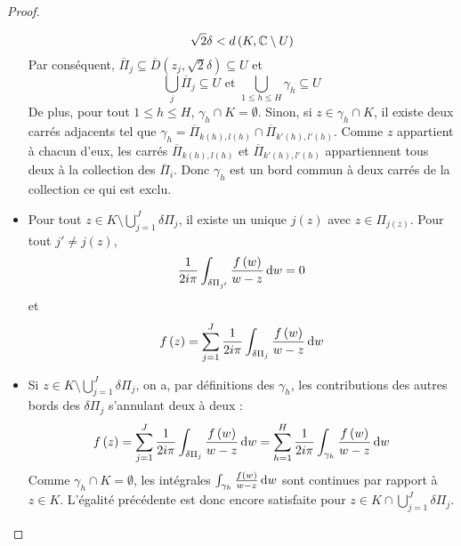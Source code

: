 \documentclass{cours}
\begin{document}
\begin{proof}
\begin{itemize}
        \begin{equation*}
            \sqrt{2}\delta < d\left(K, \mathbb{C} \setminus U\right)
        \end{equation*}
        Par conséquent, $\overline{\Pi}_{j} \subseteq \overline{D}\left(z_{j}, \sqrt{2}\delta\right) \subseteq U$ et 
        \begin{equation*}
            \bigcup_{j} \overline{\Pi}_{j} \subseteq U \text{ et } \bigcup_{1 \leq h \leq H} \gamma_{h} \subseteq U
        \end{equation*}
        De plus, pour tout $1 \leq h \leq H$, $\gamma_{h} \cap K = \emptyset$. Sinon, si $z \in \gamma_{h} \cap K$, il existe deux carrés adjacents tel que $\gamma_{h} = \overline{\Pi}_{k\left(h\right), l\left(h\right)} \cap \overline{\Pi}_{k'\left(h\right), l'\left(h\right)}$. Comme $z$ appartient à chacun d'eux, les carrés $\overline{\Pi}_{k\left(h\right), l\left(h\right)}$ et $\overline{\Pi}_{k'\left(h\right), l'\left(h\right)}$ appartiennent tous deux à la collection des $\overline{\Pi}_{i}$. Donc $\gamma_{h}$ est un bord commun à deux carrés de la collection ce qui est exclu. 
        \item Pour tout $z \in K \setminus \bigcup\limits_{j = 1}^{J} \delta\Pi_{j}$, il existe un unique $j\left(z\right)$ avec $z \in \Pi_{j\left(z\right)}$. Pour tout $j' \neq j\left(z\right)$, 
        \begin{equation*}
            \frac{1}{2i\pi} \int_{\delta\Pi_{j'}}\frac{f\left(w\right)}{w-z}{\rm \, d} w = 0
        \end{equation*}
        et 
        \begin{equation*}
            f\left(z\right) = \sum_{j = 1}^{J}\frac{1}{2i\pi}\int_{\delta\Pi_{j}}\frac{f\left(w\right)}{w-z}{\rm \, d} w
        \end{equation*}
        \item Si $z \in K \setminus \bigcup_{j = 1}^{J}\delta \Pi_{j}$, on a, par définitions des $\gamma_{h}$, les contributions des autres bords des $\delta \Pi_{j}$ s'annulant deux à deux : 
        \begin{equation*}
            f\left(z\right) = \sum_{j = 1}^{J}\frac{1}{2i\pi} \int_{\delta \Pi_{j}}\frac{f\left(w\right)}{w - z}{\rm \, d} w = \sum_{h = 1}^{H}\frac{1}{2i\pi}\int_{\gamma_{h}}\frac{f\left(w\right)}{w-z} {\rm \, d} w
        \end{equation*}
        Comme $\gamma_{h} \cap K = \emptyset$, les intégrales $\int_{\gamma_{h}}\frac{f\left(w\right)}{w-z} {\rm \, d} w$ sont continues par rapport à $z \in K$. L'égalité précédente est donc encore satisfaite pour $z \in K \cap \bigcup_{j = 1}^{J} \delta \Pi_{j}$.\\

\end{itemize}
\end{proof}
\end{document}
